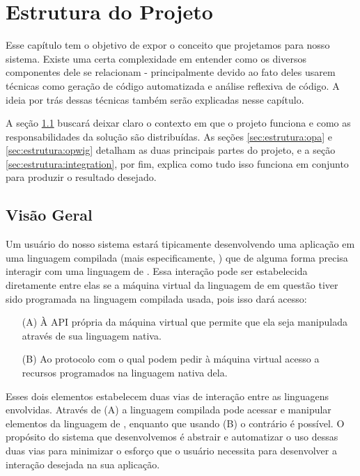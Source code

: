 \chapter{Estrutura do Projeto}
\label{sec:estrutura}

  Esse capítulo tem o objetivo de expor o conceito que projetamos para nosso
  sistema. Existe uma certa complexidade em entender como os diversos
  componentes dele se relacionam - principalmente devido ao fato deles usarem
  técnicas como geração de código automatizada e análise reflexiva de código. A
  ideia por trás dessas técnicas também serão explicadas nesse capítulo.
  
  A seção \ref{sec:estrutura:geral} buscará deixar
  claro o contexto em que o projeto funciona e como as responsabilidades da
  solução são distribuídas. As seções \ref{sec:estrutura:opa} e
  \ref{sec:estrutura:opwig} detalham as duas principais partes do projeto, e a
  seção \ref{sec:estrutura:integration}, por fim, explica como tudo isso
  funciona em conjunto para produzir o resultado desejado.

  \section{Visão Geral}
  \label{sec:estrutura:geral}
  
    Um usuário do nosso sistema estará tipicamente desenvolvendo uma aplicação
    em uma linguagem compilada (mais especificamente, \CXX{}) que de alguma
    forma precisa interagir com uma linguagem de \script{}. Essa interação pode
    ser estabelecida diretamente entre elas se a máquina virtual da linguagem de
    \script{} em questão tiver sido programada na linguagem compilada usada,
    pois isso dará acesso:
    
    \begin{itemize}
      \item[(A)]
        À API própria da máquina virtual que permite que ela seja manipulada
        através de sua linguagem nativa.
      \item[(B)]
        Ao protocolo com o qual  podem pedir à máquina virtual acesso
        a recursos programados na linguagem nativa dela.
    \end{itemize}

    Esses dois elementos estabelecem duas vias de interação entre as linguagens
    envolvidas. Através de (A) a linguagem compilada pode acessar e manipular
    elementos da linguagem de \script{}, enquanto que usando (B) o contrário é
    possível. O propósito do sistema que desenvolvemos é abstrair e automatizar
    o uso dessas duas vias para minimizar o esforço que o usuário necessita para
    desenvolver a interação desejada na sua aplicação.

